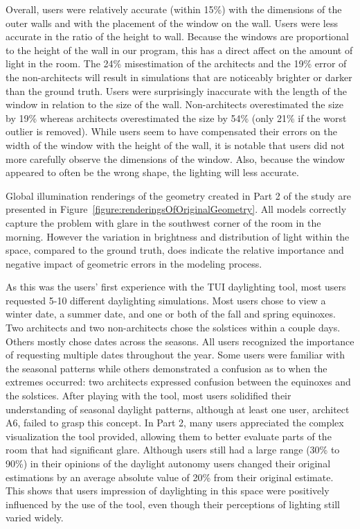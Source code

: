 \documentclass[review]{vgtc}                 %
\begin{document}
Overall, users were relatively accurate (within 15\%) with the
dimensions of the outer walls and with the placement of the window on
the wall.  Users were less accurate in the ratio of the height to
wall.  Because the windows are proportional to the height of the wall
in our program, this has a direct affect on the amount of light in the
room.  The 24\% misestimation of the architects and the 19\% error of
the non-architects will result in simulations that are noticeably 
brighter or darker than the ground truth.
%
Users were surprisingly inaccurate with the length of the window in
relation to the size of the wall.  Non-architects overestimated the
size by 19\% whereas architects overestimated the size by 54\% (only
21\% if the worst outlier is removed).  While users seem to have
compensated their errors on the width of the window with the height of
the wall, it is notable that users did not more carefully observe the
dimensions of the window.  Also, because the window appeared to often
be the wrong shape, the lighting will less accurate.

Global illumination renderings of the geometry created in Part 2 of
the study are presented in
Figure~\ref{figure:renderingsOfOriginalGeometry}.  All models
correctly capture the problem with glare in the southwest corner of
the room in the morning.  However the variation in brightness and
distribution of light within the space, compared to the ground truth,
does indicate the relative importance and negative impact of geometric
errors in the modeling process.


As this was the users' first experience with the TUI daylighting tool,
most users requested 5-10 different daylighting simulations.  Most
users chose to view a winter date, a summer date, and one or both of
the fall and spring equinoxes.  Two architects and two non-architects
chose the solstices within a couple days.  Others mostly chose dates
across the seasons.  All users recognized the importance of requesting
multiple dates throughout the year.  Some users were familiar with the
seasonal patterns while others demonstrated a confusion as to when the
extremes occurred: two architects expressed confusion between the
equinoxes and the solstices.  After playing with the tool, most users
solidified their understanding of seasonal daylight patterns, although at
least one user, architect A6, failed to grasp this concept.  In Part
2, many users appreciated the complex visualization the tool provided,
allowing them to better evaluate parts of the room that had
significant glare.  Although users still had a large range (30\% to
90\%) in their opinions of the daylight autonomy users changed their
original estimations by an average absolute value of 20\% from their
original estimate.  This shows that users impression of daylighting in
this space were positively influenced by the use of the tool, even
though their perceptions of lighting still varied widely.
\end{document}
